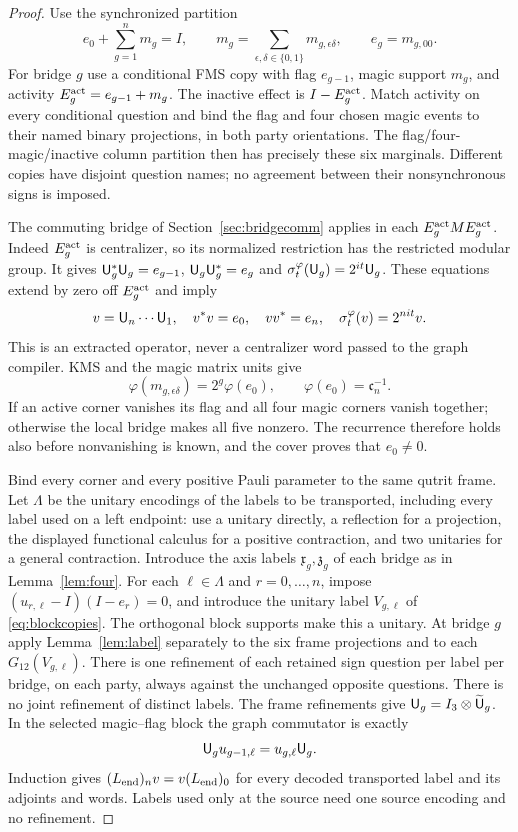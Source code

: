 \begin{proof}
Use the synchronized partition
\[
 e_0+\sum_{g=1}^n m_g=I,\qquad
 m_g=\sum_{\epsilon,\delta\in\{0,1\}}m_{g,\epsilon\delta},\qquad e_g=m_{g,00}.
\]
For bridge $g$ use a conditional FMS copy with flag $e_{g-1}$, magic support $m_g$, and activity $E^{\rm act}_g=e_{g-1}+m_g$. The inactive effect is $I-E^{\rm act}_g$. Match activity on every conditional question and bind the flag and four chosen magic events to their named binary projections, in both party orientations. The flag/four-magic/inactive column partition then has precisely these six marginals. Different copies have disjoint question names; no agreement between their nonsynchronous signs is imposed.

The commuting bridge of Section~\ref{sec:bridgecomm} applies in each $E^{\rm act}_gME^{\rm act}_g$. Indeed $E^{\rm act}_g$ is centralizer, so its normalized restriction has the restricted modular group. It gives ${\mathsf U}_g^*{\mathsf U}_g=e_{g-1}$, ${\mathsf U}_g{\mathsf U}_g^*=e_g$ and $\sigma_t^\varphi({\mathsf U}_g)=2^{it}{\mathsf U}_g$. These equations extend by zero off $E^{\rm act}_g$ and imply
\[
 v={\mathsf U}_n\cdots {\mathsf U}_1,\quad
 v^*v=e_0,\quad
 vv^*=e_n,\quad
 \sigma_t^\varphi(v)=2^{nit}v.
\]
This is an extracted operator, never a centralizer word passed to the graph compiler. KMS and the magic matrix units give
\[
 \varphi(m_{g,\epsilon\delta})=2^g\varphi(e_0),\qquad
 \varphi(e_0)=\mathfrak c_n^{-1}.
\]
If an active corner vanishes its flag and all four magic corners vanish together; otherwise the local bridge makes all five nonzero. The recurrence therefore holds also before nonvanishing is known, and the cover proves that $e_0\ne0$.

Bind every corner and every positive Pauli parameter to the same qutrit frame. Let $\Lambda$ be the unitary encodings of the labels to be transported, including every label used on a left endpoint: use a unitary directly, a reflection for a projection, the displayed functional calculus for a positive contraction, and two unitaries for a general contraction. Introduce the axis labels $\mathfrak x_g,\mathfrak z_g$ of each bridge as in Lemma~\ref{lem:four}. For each $\ell\in\Lambda$ and $r=0,\ldots,n$, impose $(u_{r,\ell}-I)(I-e_r)=0$, and introduce the unitary label $V_{g,\ell}$ of \eqref{eq:blockcopies}. The orthogonal block supports make this a unitary. At bridge $g$ apply Lemma~\ref{lem:label} separately to the six frame projections and to each $G_{12}(V_{g,\ell})$. There is one refinement of each retained sign question per label per bridge, on each party, always against the unchanged opposite questions. There is no joint refinement of distinct labels. The frame refinements give ${\mathsf U}_g=I_3\otimes\widetilde {\mathsf U}_g$. In the selected magic--flag block the graph commutator is exactly
\[
 {\mathsf U}_gu_{g-1,\ell}=u_{g,\ell}{\mathsf U}_g.
\]
Induction gives $(L_{\rm end})_nv=v(L_{\rm end})_0$ for every decoded transported label and its adjoints and words. Labels used only at the source need one source encoding and no refinement.


\end{proof}
